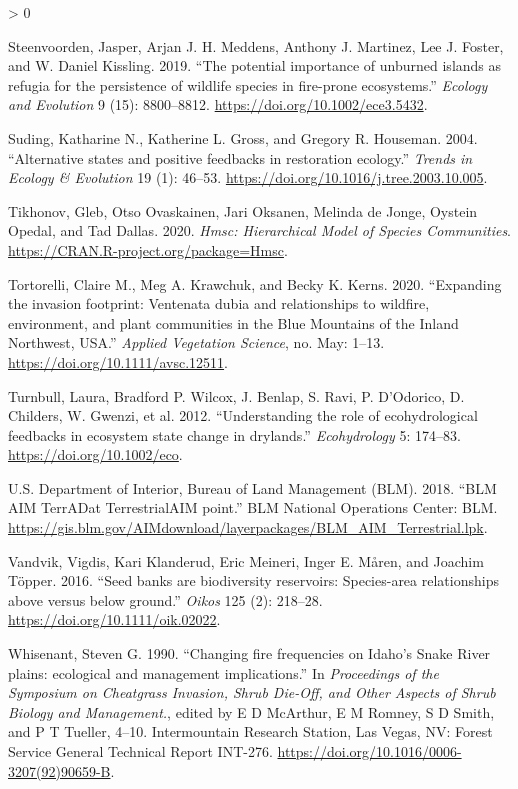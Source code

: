 \documentclass[
  12pt,
]{article}
\newlength{\cslhangindent}
\newenvironment{CSLReferences}[2] %
 {%
  \setlength{\parindent}{0pt}
  \ifodd #1 \everypar{\setlength{\hangindent}{\cslhangindent}}\ignorespaces\fi
  \ifnum #2 > 0
  \setlength{\parskip}{#2\baselineskip}
  \fi
 }%
 {}
\begin{document}
\begin{CSLReferences}{1}{0}
\leavevmode\hypertarget{ref-Steenvoorden2019}{}%
Steenvoorden, Jasper, Arjan J. H. Meddens, Anthony J. Martinez, Lee J.
Foster, and W. Daniel Kissling. 2019. {``{The potential importance of
unburned islands as refugia for the persistence of wildlife species in
fire-prone ecosystems}.''} \emph{Ecology and Evolution} 9 (15):
8800--8812. \url{https://doi.org/10.1002/ece3.5432}.

\leavevmode\hypertarget{ref-Suding2004}{}%
Suding, Katharine N., Katherine L. Gross, and Gregory R. Houseman. 2004.
{``{Alternative states and positive feedbacks in restoration
ecology}.''} \emph{Trends in Ecology \& Evolution} 19 (1): 46--53.
\url{https://doi.org/10.1016/j.tree.2003.10.005}.

\leavevmode\hypertarget{ref-HMSC}{}%
Tikhonov, Gleb, Otso Ovaskainen, Jari Oksanen, Melinda de Jonge, Oystein
Opedal, and Tad Dallas. 2020. \emph{Hmsc: Hierarchical Model of Species
Communities}. \url{https://CRAN.R-project.org/package=Hmsc}.

\leavevmode\hypertarget{ref-Tortorelli2020}{}%
Tortorelli, Claire M., Meg A. Krawchuk, and Becky K. Kerns. 2020.
{``{Expanding the invasion footprint: Ventenata dubia and relationships
to wildfire, environment, and plant communities in the Blue Mountains of
the Inland Northwest, USA}.''} \emph{Applied Vegetation Science}, no.
May: 1--13. \url{https://doi.org/10.1111/avsc.12511}.

\leavevmode\hypertarget{ref-Turnbull2012}{}%
Turnbull, Laura, Bradford P. Wilcox, J. Benlap, S. Ravi, P. D'Odorico,
D. Childers, W. Gwenzi, et al. 2012. {``{Understanding the role of
ecohydrological feedbacks in ecosystem state change in drylands}.''}
\emph{Ecohydrology} 5: 174--83. \url{https://doi.org/10.1002/eco}.

\leavevmode\hypertarget{ref-AIM}{}%
U.S. Department of Interior, Bureau of Land Management (BLM). 2018.
{``{BLM AIM TerrADat TerrestrialAIM point}.''} BLM National Operations
Center: BLM.
\url{https://gis.blm.gov/AIMdownload/layerpackages/BLM_AIM_Terrestrial.lpk}.

\leavevmode\hypertarget{ref-Vandvik2016}{}%
Vandvik, Vigdis, Kari Klanderud, Eric Meineri, Inger E. Måren, and
Joachim Töpper. 2016. {``{Seed banks are biodiversity reservoirs:
Species-area relationships above versus below ground}.''} \emph{Oikos}
125 (2): 218--28. \url{https://doi.org/10.1111/oik.02022}.

\leavevmode\hypertarget{ref-Whisenant1990}{}%
Whisenant, Steven G. 1990. {``{Changing fire frequencies on Idaho's
Snake River plains: ecological and management implications}.''} In
\emph{Proceedings of the Symposium on Cheatgrass Invasion, Shrub
Die-Off, and Other Aspects of Shrub Biology and Management.}, edited by
E D McArthur, E M Romney, S D Smith, and P T Tueller, 4--10.
Intermountain Research Station, Las Vegas, NV: Forest Service General
Technical Report INT-276.
\url{https://doi.org/10.1016/0006-3207(92)90659-B}.


\end{CSLReferences}
\end{document}
